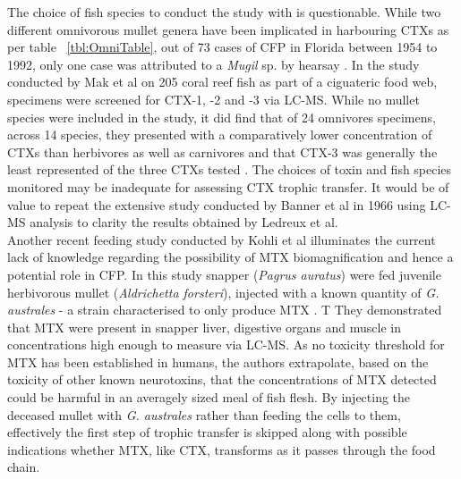 \documentclass[12pt]{article}
\begin{document}
The choice of fish species to conduct the study with is questionable. While two different omnivorous mullet genera have been implicated in harbouring CTXs as per table ~\ref{tbl:OmniTable}, out of 73 cases of CFP in Florida between 1954 to 1992, only one case was attributed to a \emph{Mugil} sp. by hearsay \cite{de1994distribution}. In the study conducted by Mak et al on 205 coral reef fish as part of a ciguateric food web, specimens were screened for CTX-1, -2 and -3 via LC-MS. While no mullet species were included in the study, it did find that of 24 omnivores specimens, across 14 species, they presented with a comparatively lower concentration of CTXs than herbivores as well as carnivores and that CTX-3 was generally the least represented of the three CTXs tested \cite{mak2013pacific}. 
The choices of toxin and fish species monitored may be inadequate for assessing CTX trophic transfer. It would be of value to repeat the extensive study conducted by Banner et al in 1966 using LC-MS analysis to clarity the results obtained by Ledreux et al.\\


Another recent feeding study conducted by Kohli et al illuminates the current lack of knowledge regarding the possibility of MTX biomagnification and hence a potential role in CFP. In this study snapper (\emph{Pagrus auratus}) were fed juvenile herbivorous mullet (\emph{Aldrichetta forsteri}), injected with a known quantity of\emph{ G. australes} - a strain characterised to only produce MTX  \cite{kohli2014feeding}. T They demonstrated that MTX were present in snapper liver, digestive organs and muscle in concentrations high enough to measure via LC-MS. As no toxicity threshold for MTX has been established in humans, the authors extrapolate, based on the toxicity of other known neurotoxins, that the concentrations of MTX detected could be harmful in an averagely sized meal of fish flesh\cite{kohli2014feeding}.
By injecting the deceased mullet with \emph{G. australes} rather than feeding the cells to them, effectively the first step of trophic transfer is skipped along with possible indications whether MTX, like CTX, transforms as it passes through the food chain. \\
\end{document}
